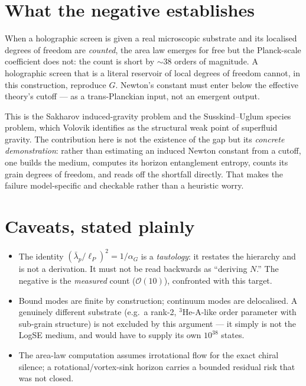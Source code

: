 \documentclass[11pt]{article}
\begin{document}
\section{What the negative establishes}

\begin{resultbox}
\noindent When a holographic screen is given a real microscopic substrate and
its localised degrees of freedom are \emph{counted}, the area law emerges for
free but the Planck-scale coefficient does not: the count is short by $\sim$38
orders of magnitude. A holographic screen that is a literal reservoir of local
degrees of freedom cannot, in this construction, reproduce $G$. Newton's constant
must enter below the effective theory's cutoff --- as a trans-Planckian input,
not an emergent output.
\end{resultbox}

This is the Sakharov induced-gravity problem and the Susskind--Uglum species
problem, which Volovik identifies as the structural weak point of superfluid
gravity. The contribution here is not the existence of the gap but its
\emph{concrete demonstration}: rather than estimating an induced Newton constant
from a cutoff, one builds the medium, computes its horizon entanglement entropy,
counts its grain degrees of freedom, and reads off the shortfall directly. That
makes the failure model-specific and checkable rather than a heuristic worry.

\section{Caveats, stated plainly}

\begin{itemize}[leftmargin=1.4em]
\item The identity $(\bar{\lambda}_p/\ell_P)^2 = 1/\alpha_G$ is a \emph{tautology}: it
  restates the hierarchy and is not a derivation. It must not be read backwards as
  ``deriving $N$.'' The negative is the \emph{measured} count
  ($\mathcal{O}(10)$), confronted with this target.
\item Bound modes are finite by construction; continuum modes are delocalised.
  A genuinely different substrate (e.g.\ a rank-2, $^3$He-A-like order parameter
  with sub-grain structure) is not excluded by this argument --- it simply is not
  the LogSE medium, and would have to supply its own $10^{38}$ states.
\item The area-law computation assumes irrotational flow for the exact chiral
  silence; a rotational/vortex-sink horizon carries a bounded residual risk that
  was not closed.
\end{itemize}
\end{document}
